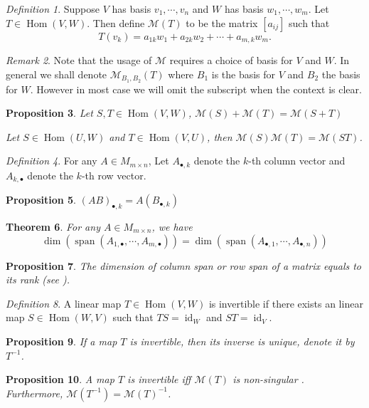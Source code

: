 \documentclass[12pt]{amsart}
\DeclareMathOperator{\s}{span}
\DeclareMathOperator{\Hom}{Hom}
\newcommand{\calM}[0]{\mathcal{M}}
\DeclareMathOperator{\id}{id}
\newtheorem{theorem}{Theorem}[section]
\newtheorem{proposition}[theorem]{Proposition}
\theoremstyle{remark}
\newtheorem{remark}[theorem]{Remark}
\newtheorem{definition}[theorem]{Definition}
\numberwithin{equation}{section}
\begin{document}
	\begin{definition}
	Suppose $V$ has basis $v_1,\cdots,v_n$ and $W$ has basis $w_1,\cdots,w_m$.
		Let $T\in\Hom(V,W)$. Then define $\calM(T)$ to be the matrix $[a_{ij}]$
		such that $$T(v_k)=a_{1k}w_1+a_{2k}w_2+\cdots+a_{m,k}w_m.$$%
	\end{definition}
	\begin{remark}
		Note that the usage of $\calM$ requires a choice of basis for $V$ and $W$. In general we shall denote $\calM_{B_1,B_2}(T)$ where $B_1$ is the basis for $V$ and $B_2$ the basis for $W$. However in most case we will omit the subscript when the context is clear.
	\end{remark}
	\begin{proposition}
		Let $S,T\in\Hom(V,W)$, 
		\(\calM(S)+\calM(T)=\calM(S+T)\)
		
		Let $S\in\Hom(U,W)$ and $T\in\Hom(V,U)$, then $\calM(S)\calM(T)=\calM(ST)$.
	\end{proposition}
	\begin{definition}
		For any $A\in M_{m\times n}$, Let $A_{\bullet,k}$ denote the $k$-th column vector and $A_{k,\bullet}$ denote the $k$-th row vector.	
	\end{definition}
	\begin{proposition}
		$(AB)_{\bullet,k}=A (B_{\bullet,k})$
	\end{proposition}
	\begin{theorem}\label{thm:col-row-dim}
		For any $A\in M_{m\times n}$, we have
		\[\dim(\s(A_{1,\bullet},\cdots,A_{m,\bullet}))=\dim(\s(A_{\bullet,1},\cdots,A_{\bullet,n})) \]
	\end{theorem}


	\begin{proposition}
		The dimension of column span or row span of a matrix equals to its rank (see ).
	\end{proposition}
	\begin{definition}
		A linear map $T\in \Hom(V,W)$ is invertible if there exists an linear map $S\in\Hom(W,V)$ such that $TS=\id_W$ and $ST=\id_V$.
	\end{definition}
	\begin{proposition}
		If a map $T$ is invertible, then its inverse is unique, denote it by $T^{-1}$.
	\end{proposition}
	\begin{proposition}
		A map $T$ is invertible iff $\calM(T)$ is non-singular . Furthermore, $\calM(T^{-1})=\calM(T)^{-1}$.
	\end{proposition}
		
\end{document}
